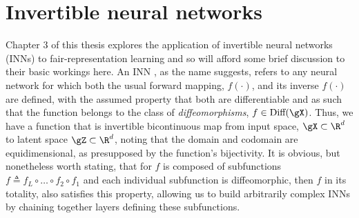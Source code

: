 \section{Invertible neural networks}\label{sec:inns}
Chapter 3 of this thesis explores the application of invertible neural networks (INNs) to
fair-representation learning and so will afford some brief discussion to their basic workings here.
%
%
An INN \citep{kobyzev2020normalizing}, as the name suggests, refers to any neural network for which
both the usual forward mapping, \(f(\cdot)\), and its inverse \(f(\cdot)\) are defined, with the
assumed property that both are differentiable and as such that the function belongs to the class of
\emph{diffeomorphisms}, \(f \in \text{Diff}(\gX)\). 
%
Thus, we have a function that is invertible bicontinuous map from input space, \(\gX \subset \R^d
\) to latent space \(\gZ \subset \R^d \), noting that the domain and codomain are equidimensional,
as presupposed by the function's bijectivity.
%
It is obvious, but nonetheless worth stating, that for \(f\) is composed of subfunctions \(f
\triangleq f_L \circ \dots \circ f_2 \circ f_1\) and each individual subfunction is diffeomorphic,
then \(f\) in its totality, also satisfies this property, allowing us to build arbitrarily complex
INNs by chaining together layers defining these subfunctions.
%

